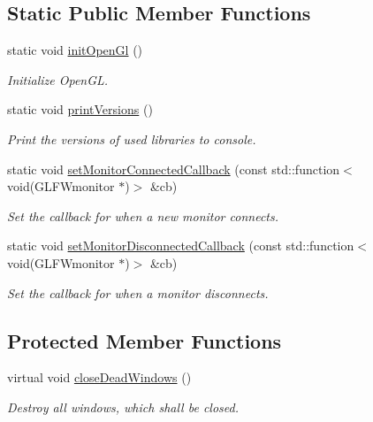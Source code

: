 \subsection*{Static Public Member Functions}
\begin{DoxyCompactItemize}
\item 
static void \mbox{\hyperlink{classec_1_1_application_a8d6ef43e247b541017fa82e001c42995}{init\+Open\+Gl}} ()
\begin{DoxyCompactList}\small\item\em Initialize Open\+GL. \end{DoxyCompactList}\item 
static void \mbox{\hyperlink{classec_1_1_application_a329a3b03c23e5aba31bbbb175930dbae}{print\+Versions}} ()
\begin{DoxyCompactList}\small\item\em Print the versions of used libraries to console. \end{DoxyCompactList}\item 
static void \mbox{\hyperlink{classec_1_1_application_a9a3c539d9fef8d51ce3c32b63d11b495}{set\+Monitor\+Connected\+Callback}} (const std\+::function$<$ void(G\+L\+F\+Wmonitor $\ast$)$>$ \&cb)
\begin{DoxyCompactList}\small\item\em Set the callback for when a new monitor connects. \end{DoxyCompactList}\item 
static void \mbox{\hyperlink{classec_1_1_application_acc0a3dd9509ade9a6297b816d07441d6}{set\+Monitor\+Disconnected\+Callback}} (const std\+::function$<$ void(G\+L\+F\+Wmonitor $\ast$)$>$ \&cb)
\begin{DoxyCompactList}\small\item\em Set the callback for when a monitor disconnects. \end{DoxyCompactList}\end{DoxyCompactItemize}
\subsection*{Protected Member Functions}
\begin{DoxyCompactItemize}
\item 
virtual void \mbox{\hyperlink{classec_1_1_application_ad6a3915f4ea913bf392a03fbd3548d99}{close\+Dead\+Windows}} ()
\begin{DoxyCompactList}\small\item\em Destroy all windows, which shall be closed. \end{DoxyCompactList}\end{DoxyCompactItemize}
